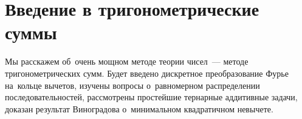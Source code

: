 
\section*{Введение в тригонометрические суммы}



Мы расскажем об~очень мощном методе теории чисел~--- методе тригонометрических
сумм.
Будет введено дискретное преобразование Фурье на~кольце вычетов, изучены
вопросы о~равномерном распределении последовательностей, рассмотрены простейшие
тернарные аддитивные задачи, доказан результат Виноградова о~минимальном
квадратичном невычете.

